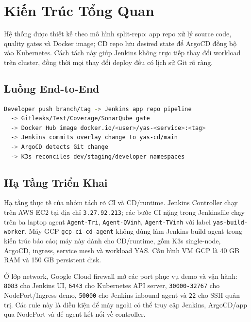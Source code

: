 \section{Kiến Trúc Tổng Quan}

Hệ thống được thiết kế theo mô hình split-repo: app repo xử lý source code,
quality gates và Docker image; CD repo lưu desired state để ArgoCD đồng bộ vào
Kubernetes. Cách tách này giúp Jenkins không trực tiếp thay đổi workload trên
cluster, đồng thời mọi thay đổi deploy đều có lịch sử Git rõ ràng.

\subsection{Luồng End-to-End}

\begin{lstlisting}[language=bash, caption={Luồng source-to-runtime của đồ án}]
Developer push branch/tag -> Jenkins app repo pipeline
  -> Gitleaks/Test/Coverage/SonarQube gate
  -> Docker Hub image docker.io/<user>/yas-<service>:<tag>
  -> Jenkins commits overlay change to yas-cd/main
  -> ArgoCD detects Git change
  -> K3s reconciles dev/staging/developer namespaces
\end{lstlisting}

\subsection{Hạ Tầng Triển Khai}

Hạ tầng thực tế của nhóm tách rõ CI và CD/runtime. Jenkins Controller chạy trên
AWS EC2 tại địa chỉ \texttt{3.27.92.213}; các bước CI nặng trong Jenkinsfile
chạy trên ba laptop agent \texttt{Agent-Tri}, \texttt{Agent-QVinh},
\texttt{Agent-TVinh} với label \texttt{yas-build-worker}. Máy GCP
\texttt{gcp-ci-cd-agent} không dùng làm Jenkins build agent trong kiến trúc
báo cáo; máy này dành cho CD/runtime, gồm K3s single-node, ArgoCD, ingress,
service mesh và workload YAS. Cấu hình VM GCP là 40 GB RAM và 150 GB
persistent disk.

Ở lớp network, Google Cloud firewall mở các port phục vụ demo và vận hành:
\texttt{8083} cho Jenkins UI, \texttt{6443} cho Kubernetes API server,
\texttt{30000-32767} cho NodePort/Ingress demo, \texttt{50000} cho Jenkins
inbound agent và \texttt{22} cho SSH quản trị. Các rule này là điều kiện để máy
ngoài có thể truy cập Jenkins, ArgoCD/app qua NodePort và để agent kết nối về
controller.

